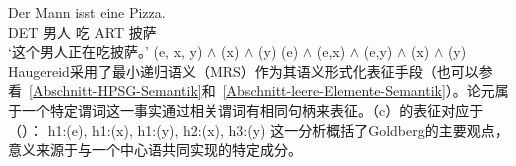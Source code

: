 \begin{exe}
\begin{xlist}[iv.]
\begin{exe}
\begin{xlist}[iv.]
\eal
\ex 
\gll Der Mann isst eine Pizza.\\
	 DET 男人 吃 ART 披萨\\
\glt `这个男人正在吃披萨。'
\ex {}(e, x, y) $\wedge$ (x) $\wedge$ (y)
\ex {}(e) $\wedge$ (e,x) $\wedge$ (e,y) $\wedge$ (x) $\wedge$ (y)
\zl
Haugereid采用了最小递归语义（MRS）\indexmrsc 作为其语义形式化表征手段（也可以参看~\ref{Abschnitt-HPSG-Semantik}和~\ref{Abschnitt-leere-Elemente-Semantik}）。论元属于一个特定谓词这一事实通过相关谓词有相同句柄来表征。（c）的表征对应于（）：
\ea
h1:(e), h1:(x), h1:(y), h2:(x), h3:(y)
\z
这一分析概括了Goldberg的主要观点，意义来源于与一个中心语共同实现的特定成分。


\end{xlist}
\end{exe}
\end{xlist}
\end{exe}

